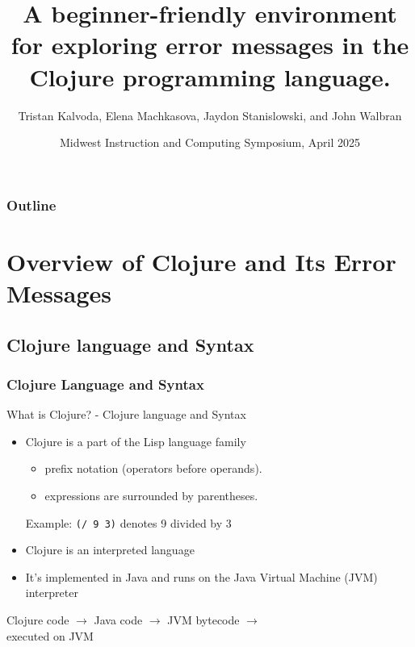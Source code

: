 \documentclass{beamer}
\begin{document}
\title{A beginner-friendly environment for exploring error messages in the Clojure programming language.}
\author{Tristan Kalvoda, Elena Machkasova, Jaydon Stanislowski, and John Walbran}
\date[]  
{Midwest Instruction and Computing Symposium, April 2025}

\begin{frame}
  \titlepage
\end{frame}

\begin{frame}

  \frametitle{Outline}
\tableofcontents
\end{frame}

\section{Overview of Clojure and Its Error Messages}

\subsection{Clojure language and Syntax}
\begin{frame}
\frametitle{Clojure Language and Syntax}
What is Clojure? - Clojure language and Syntax
\begin{itemize}
  \item Clojure is a part of the Lisp language family
  \begin{itemize}
    \item prefix notation (operators before operands).
    \item expressions are surrounded by parentheses.
  \end{itemize}
  Example: \texttt{(/ 9 3)} denotes 9 divided by 3
  \item Clojure is an interpreted language
  \item It's implemented in Java and runs on the Java Virtual Machine (JVM) interpreter
\end{itemize}
  Clojure code \(\rightarrow\) Java code \(\rightarrow\) JVM bytecode \(\rightarrow\) \\ executed on JVM
\end{frame}
\end{document}
